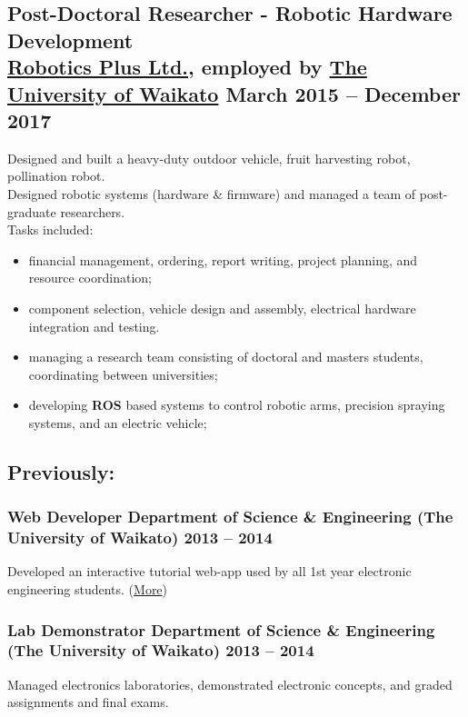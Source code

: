 \documentclass[english]{extarticle}
\begin{document}
\subsection*{Post-Doctoral Researcher - Robotic Hardware Development \\\textmd{\footnotesize \href{https://www.roboticsplus.co.nz/}{Robotics Plus Ltd.}, employed by \href{https://waikato.ac.nz}{The University of Waikato} \hfill{} \textbf{March 2015 -- December 2017}}}
Designed and built a heavy-duty outdoor vehicle, fruit harvesting robot, pollination robot.\\
Designed robotic systems (hardware \& firmware) and managed a team of post-graduate researchers.\\
Tasks included:
\begin{itemize}
    \item financial management, ordering, report writing, project planning, and resource coordination;
    \item component selection, vehicle design and assembly, electrical hardware integration and testing.
    \item managing a research team consisting of doctoral and masters students, coordinating between universities;
    \item developing \textbf{ROS} based systems to control robotic arms, precision spraying systems, and an electric vehicle;
\end{itemize}

\subsection*{Previously:}

\subsubsection*{Web Developer \textmd{\footnotesize Department of Science \& Engineering (The University of Waikato) \hfill{} \textbf{2013 -- 2014}}}
\vspace{-2mm}
Developed an interactive tutorial web-app used by all 1st year electronic engineering students. (\href{https://markhedleyjones.com/projects/electronics-tutorial-website}{More})

\subsubsection*{Lab Demonstrator \textmd{\footnotesize Department of Science \& Engineering (The University of Waikato) \hfill{} \textbf{2013 -- 2014}}}
\vspace{-2mm}
Managed electronics laboratories, demonstrated electronic concepts, and graded assignments and final exams.
\end{document}
